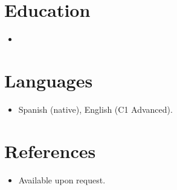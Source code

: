 \documentclass[11pt,a4paper,sans]{moderncv}
\begin{document}

\section{Education}
\vspace{1pt}
\begin{itemize}

\item{}

\end{itemize}


\section{Languages}
\vspace{1pt}
\begin{itemize}
\item Spanish (native), English (C1 Advanced).
\end{itemize}


\section{References}
\vspace{1pt}
\begin{itemize}
\item{Available upon request.}
\end{itemize}
\end{document}
